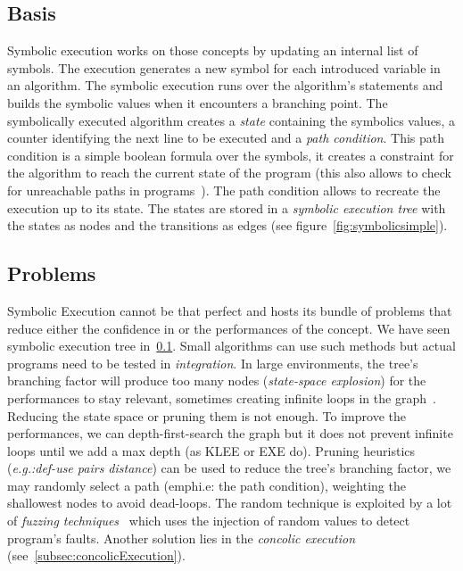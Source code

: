 \documentclass[11pt]{article}
\begin{document}
    \subsection{Basis}
      \label{sub:basis}
      Symbolic execution works on those concepts by updating an internal list of symbols. The execution generates a new symbol for each introduced variable in an algorithm\cite{newapproach}. The symbolic execution runs over the algorithm's statements and builds the symbolic values when it encounters a branching point. The symbolically executed algorithm creates a \emph{state}\cite{visserWillemCorina} containing the symbolics values, a counter identifying the next line to be executed and a \emph{path condition}. This path condition is a simple boolean formula over the symbols, it creates a constraint for the algorithm to reach the current state of the program (this also allows to check for unreachable paths in programs~\cite{InfeasiblePathsEliminationWithSymbolicExecTechniques}). The path condition allows to recreate the execution up to its state. The states are stored in a \emph{symbolic execution tree} with the states as nodes and the transitions as edges (see figure~\ref{fig:symbolicsimple}).
    \subsection{Problems}
      Symbolic Execution cannot be that perfect and hosts its bundle of problems that reduce either the confidence in or the performances of the concept. We have seen symbolic execution tree in~\ref{sub:basis}. Small algorithms can use such methods but actual programs need to be tested in \emph{integration}. In large environments, the tree's branching factor will produce too many nodes (\emph{state-space explosion}) for the performances to stay relevant, sometimes creating infinite loops in the graph~\cite{forwardSymbolicExecution}. Reducing the state space or pruning them is not enough. To improve the performances, we can depth-first-search the graph but it does not prevent infinite loops until we add a max depth (as KLEE or EXE do). %
      Pruning heuristics (\emph{e.g.:def-use pairs distance}) can be used to reduce the tree's branching factor, we may randomly select a path (emph{i.e: the path condition}), weighting the shallowest nodes to avoid dead-loops. The random technique is exploited by a lot of \emph{fuzzing techniques}~\cite{CHEN2018118} which uses the injection of random values to detect program's faults. Another solution lies in the \emph{concolic execution} (see~\ref{subsec:concolicExecution}).
\end{document}
